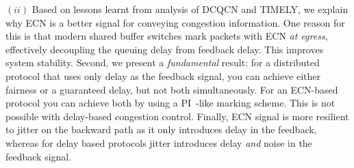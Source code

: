 $(ii)$ Based on lessons learnt from analysis of DCQCN and TIMELY,
we explain why ECN is a better signal for conveying congestion information.
One reason for this is that modern shared buffer switches mark packets with ECN
{\em at egress}, effectively decoupling the queuing delay from feedback delay.
This improves system stability. Second, we present a \emph{fundamental} result:
for a distributed protocol that uses only delay as the feedback signal, you can
achieve either fairness or a guaranteed  delay, but not both 
simultaneously. For an ECN-based protocol you can achieve both by using a
PI~\cite{hollot2001designing}-like marking scheme. This is not possible with
delay-based congestion control. Finally, ECN signal is more resilient to 
jitter on the backward path as it only introduces delay in the
feedback, whereas for delay based protocols jitter introduces delay
\emph{and} noise in the feedback signal.



